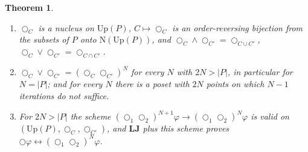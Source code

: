 \documentclass[11pt]{amsart}
\newtheorem{thm}{Theorem}[section]
\theoremstyle{definition}
\newcommand{\Up}{\mathrm{Up}}
\newcommand{\Nuc}{\mathrm{N}}
\newcommand{\LLJ}{\mathbf{LJ}}
\newcommand{\lax}{\bigcirc}
\newcommand{\laxa}{\bigcirc_1}
\newcommand{\laxb}{\bigcirc_2}
\begin{document}
\begin{thm}\label{thm:poset}
\begin{enumerate}
\item[(i)] $\lax_C$ is a nucleus on $\Up(P)$, $C\mapsto\lax_C$ is an
order-reversing bijection from the subsets of $P$ onto $\Nuc(\Up(P))$, and
$\lax_C\wedge\lax_{C'}=\lax_{C\cup C'}$, $\lax_C\vee\lax_{C'}=\lax_{C\cap C'}$.
\item[(ii)] $\lax_C\vee\lax_{C'}=(\lax_C\lax_{C'})^N$ for every $N$ with $2N>|P|$,
in particular for $N=|P|$; and for every $N$ there is a poset with $2N$ points
on which $N-1$ iterations do not suffice.
\item[(iii)] For $2N>|P|$ the scheme $(\laxa\laxb)^{N+1}\varphi\to(\laxa\laxb)^N\varphi$
is valid on $(\Up(P),\lax_C,\lax_{C'})$, and $\LLJ$ plus this scheme proves
$\lax\varphi\leftrightarrow(\laxa\laxb)^N\varphi$.
\end{enumerate}
\end{thm}
\end{document}
